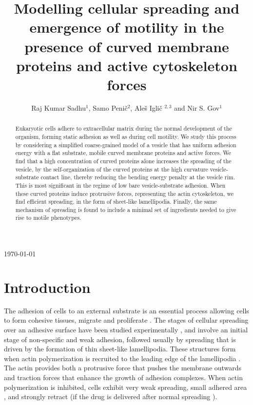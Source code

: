 \documentclass[pre,amsmath]{revtex4}
\begin{document}
\today

\title{Modelling cellular spreading and emergence of motility in the presence of curved membrane proteins and active cytoskeleton forces}

\author{Raj Kumar Sadhu$^1$, Samo Peni\v{c}$^2$, Ale\v{s} Igli\v{c} $^{2,3}$ and Nir S. Gov$^1$}


\begin{abstract}
Eukaryotic cells adhere to extracellular matrix during the normal development of the organism, forming static adhesion as well as during cell motility. We study this process by considering a simplified coarse-grained model of a vesicle that has uniform adhesion energy with a flat substrate, mobile curved membrane proteins and active forces. We find that a high concentration of curved proteins alone increases the spreading of the vesicle, by the self-organization of the curved proteins at the high curvature vesicle-substrate contact line, thereby reducing the bending energy penalty at the vesicle rim. This is most significant in the regime of low bare vesicle-substrate adhesion. When these curved proteins induce protrusive forces, representing the actin cytoskeleton, we find efficient spreading, in the form of sheet-like lamellipodia. Finally, the same mechanism of spreading is found to include a minimal set of ingredients needed to give rise to motile phenotypes.
\end{abstract}
\maketitle

\section{Introduction}
\label{intro}
The adhesion of cells to an external substrate is an essential process allowing cells to form cohesive tissues, migrate and proliferate \cite{geiger2009environmental}. The stages of cellular spreading over an adhesive surface have been studied experimentally \cite{Sheetz2004PRL,cavalcanti2007cell,cuvelier2007universal,Sheetz2008,Sheetz2011,Sheetz2014,schaufler2016selective,Nils2017}, and involve an initial stage of non-specific and weak adhesion, followed usually by spreading that is driven by the formation of thin sheet-like lamellipodia. These structures form when actin polymerization is recruited to the leading edge of the lamellipodia \cite{Oakes2018}. The actin provides both a protrusive force that pushes the membrane outwards and traction forces that enhance the growth of adhesion complexes. When actin polymerization is inhibited, cells exhibit very weak spreading, small adhered area \cite{Sheetz2008}, and strongly retract (if the drug is delivered after normal spreading \cite{bar1999pearling}).
\end{document}
